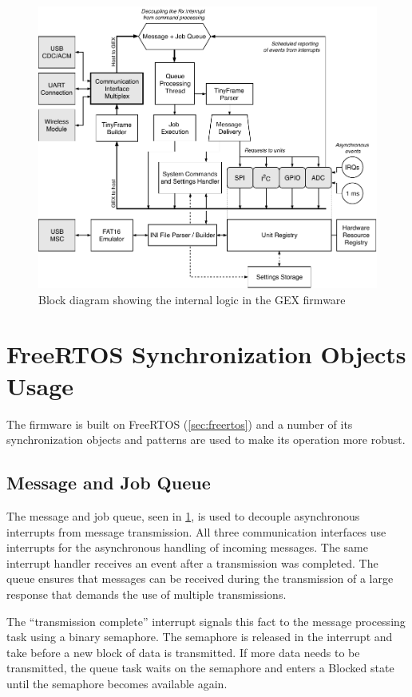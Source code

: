 \begin{figure}[h]
	\centering
	\includegraphics[scale=1] {img/gex-internal.pdf}
	\caption{\label{fig:gex-internal}Block diagram showing the internal logic in the GEX firmware}
\end{figure}

\section{FreeRTOS Synchronization Objects Usage}

The firmware is built on FreeRTOS (\cref{sec:freertos}) and a number of its synchronization objects and patterns are used to make its operation more robust.

\subsection{Message and Job Queue}

The message and job queue, seen in \cref{fig:gex-internal}, is used to decouple asynchronous interrupts from message transmission. All three communication interfaces use interrupts for the asynchronous handling of incoming messages. The same interrupt handler receives an event after a transmission was completed. The queue ensures that messages can be received during the transmission of a large response that demands the use of multiple transmissions.

The ``transmission complete'' interrupt signals this fact to the message processing task using a binary semaphore. The semaphore is released in the interrupt and take before a new block of data is transmitted. If more data needs to be transmitted, the queue task waits on the semaphore and enters a Blocked state until the semaphore becomes available again.

